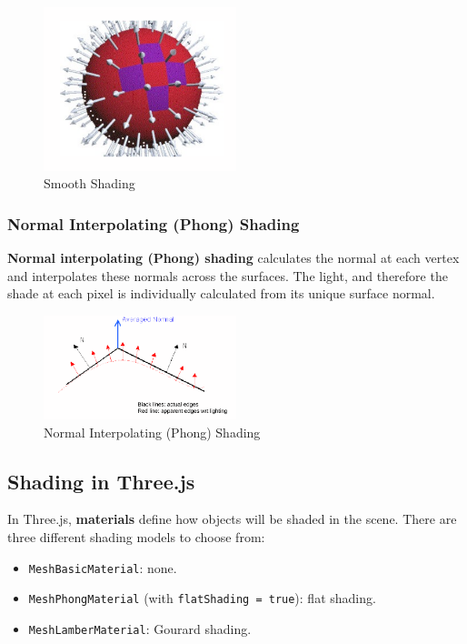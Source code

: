 \documentclass[a4paper,11pt]{article}
\begin{document}
\begin{figure}[H]
    \centering
    \includegraphics[width=0.5\textwidth]{images/smooth_shading.png}
    \caption{Smooth Shading}
\end{figure}

\subsubsection{Normal Interpolating (Phong) Shading}
\textbf{Normal interpolating (Phong) shading} calculates the normal at each vertex and interpolates these normals across the
surfaces.
The light, and therefore the shade at each pixel is individually calculated from its unique surface normal.

\begin{figure}[H]
    \centering
    \includegraphics[width=0.5\textwidth]{images/phong_shading.png}
    \caption{Normal Interpolating (Phong) Shading}
\end{figure}

\subsection{Shading in Three.js}
In Three.js, \textbf{materials} define how objects will be shaded in the scene.
There are three different shading models to choose from:
\begin{itemize}
    \item   \texttt{MeshBasicMaterial}: none.
    \item   \texttt{MeshPhongMaterial} (with \texttt{flatShading = true}): flat shading.
    \item   \texttt{MeshLamberMaterial}: Gourard shading.
\end{itemize}
\end{document}
